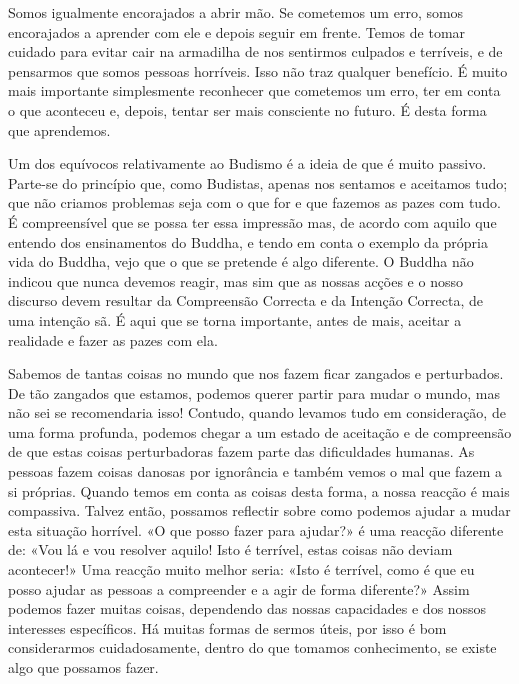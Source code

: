 Somos igualmente encorajados a abrir mão. Se cometemos um erro, somos
encorajados a aprender com ele e depois seguir em frente. Temos de tomar
cuidado para evitar cair na armadilha de nos sentirmos culpados e
terríveis, e de pensarmos que somos pessoas horríveis. Isso não traz
qualquer benefício. É muito mais importante simplesmente reconhecer que
cometemos um erro, ter em conta o que aconteceu e, depois, tentar ser
mais consciente no futuro. É desta forma que aprendemos.

Um dos equívocos relativamente ao Budismo é a ideia de que é muito
passivo. Parte-se do princípio que, como Budistas, apenas nos sentamos e
aceitamos tudo; que não criamos problemas seja com o que for e que
fazemos as pazes com tudo. É compreensível que se possa ter essa
impressão mas, de acordo com aquilo que entendo dos ensinamentos do
Buddha, e tendo em conta o exemplo da própria vida do Buddha, vejo que o
que se pretende é algo diferente. O Buddha não indicou que nunca devemos
reagir, mas sim que as nossas acções e o nosso discurso devem resultar
da Compreensão Correcta e da Intenção Correcta, de uma intenção sã. É
aqui que se torna importante, antes de mais, aceitar a realidade e fazer
as pazes com ela.

Sabemos de tantas coisas no mundo que nos fazem ficar zangados e
perturbados. De tão zangados que estamos, podemos querer partir para
mudar o mundo, mas não sei se recomendaria isso! Contudo, quando levamos
tudo em consideração, de uma forma profunda, podemos chegar a um estado
de aceitação e de compreensão de que estas coisas perturbadoras fazem
parte das dificuldades humanas. As pessoas fazem coisas danosas por
ignorância e também vemos o mal que fazem a si próprias. Quando temos em
conta as coisas desta forma, a nossa reacção é mais compassiva. Talvez
então, possamos reflectir sobre como podemos ajudar a mudar esta
situação horrível. «O que posso fazer para ajudar?» é uma reacção
diferente de: «Vou lá e vou resolver aquilo! Isto é terrível, estas
coisas não deviam acontecer!» Uma reacção muito melhor seria: «Isto é
terrível, como é que eu posso ajudar as pessoas a compreender e a agir
de forma diferente?» Assim podemos fazer muitas coisas, dependendo das
nossas capacidades e dos nossos interesses específicos. Há muitas formas
de sermos úteis, por isso é bom considerarmos cuidadosamente, dentro do
que tomamos conhecimento, se existe algo que possamos fazer.

